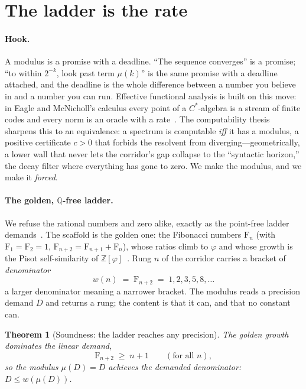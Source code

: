\documentclass[11pt,letterpaper]{article}
\theoremstyle{plain}
\newtheorem{theorem}{Theorem}[section]
\theoremstyle{definition}
\theoremstyle{remark}
\newcommand{\ZZ}{\mathbb{Z}}
\newcommand{\QQ}{\mathbb{Q}}
\newcommand{\Zphi}{\ZZ[\varphi]}
\newcommand{\fib}{\mathrm{F}}                           %
\newcommand{\modulus}{\mu}
\begin{document}
\section{The ladder is the rate}\label{sec:modulus}

\paragraph{Hook.}
A modulus is a promise with a deadline. ``The sequence converges'' is a promise;
``to within $2^{-k}$, look past term $\modulus(k)$'' is the same promise with a
deadline attached, and the deadline is the whole difference between a number you
believe in and a number you can run. Effective functional analysis is built on
this move: in Eagle and McNicholl's calculus every point of a $C^\ast$-algebra is
a stream of finite codes and every norm is an oracle with a
rate~\citep{eagle2017computable}. The computability thesis sharpens this to an
equivalence: a spectrum is computable \emph{iff} it has a modulus, a positive
certificate $c>0$ that forbids the resolvent from diverging---geometrically, a
lower wall that never lets the corridor's gap collapse to the ``syntactic
horizon,'' the decay filter where everything has gone to zero. We make the
modulus, and we make it \emph{forced}.

\paragraph{The golden, $\QQ$-free ladder.}
We refuse the rational numbers and zero alike, exactly as the point-free ladder
demands~\citep{iaom_climbing}. The scaffold is the golden one: the Fibonacci
numbers $\fib_n$ (with $\fib_1=\fib_2=1$, $\fib_{n+2}=\fib_{n+1}+\fib_n$), whose
ratios climb to $\varphi$ and whose growth is the Pisot self-similarity of
$\Zphi$~\citep{zeckendorf1972representation}. Rung $n$ of the corridor carries a
bracket of \emph{denominator}
\begin{equation}\label{eq:width}
  w(n) \;=\; \fib_{n+2} \;=\; 1,2,3,5,8,\dots
\end{equation}
a larger denominator meaning a narrower bracket. The modulus reads a precision
demand $D$ and returns a rung; the content is that it can, and that no constant
can.

\begin{theorem}[Soundness: the ladder reaches any precision]\label{thm:modsound}
The golden growth dominates the linear demand,
\begin{equation}\label{eq:fib-lower}
  \fib_{n+2}\;\ge\; n+1 \qquad(\text{for all }n),
\end{equation}
so the modulus $\modulus(D)=D$ achieves the demanded denominator:
$D\le w(\modulus(D))$.
\end{theorem}
\end{document}
